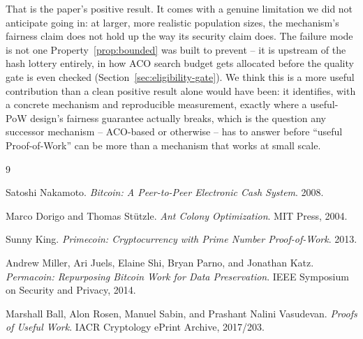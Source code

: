 \documentclass[journal]{IEEEtran}
\begin{document}
That is the paper's positive result. It comes with a genuine limitation we
did not anticipate going in: at larger, more realistic population sizes,
the mechanism's fairness claim does not hold up the way its security claim
does. The failure mode is not one Property~\ref{prop:bounded} was built to
prevent -- it is upstream of the hash lottery entirely, in how ACO search
budget gets allocated before the quality gate is even checked
(Section~\ref{sec:eligibility-gate}). We think this is a more useful
contribution than a clean positive result alone would have been: it
identifies, with a concrete mechanism and reproducible measurement, exactly
where a useful-PoW design's fairness guarantee actually breaks, which is
the question any successor mechanism -- ACO-based or otherwise -- has to
answer before ``useful Proof-of-Work'' can be more than a mechanism that
works at small scale.

\begin{thebibliography}{9}

Satoshi Nakamoto.
\textit{Bitcoin: A Peer-to-Peer Electronic Cash System}. 2008.

Marco Dorigo and Thomas St\"utzle.
\textit{Ant Colony Optimization}. MIT Press, 2004.

Sunny King.
\textit{Primecoin: Cryptocurrency with Prime Number Proof-of-Work}. 2013.

Andrew Miller, Ari Juels, Elaine Shi, Bryan Parno, and Jonathan Katz.
\textit{Permacoin: Repurposing Bitcoin Work for Data Preservation}.
IEEE Symposium on Security and Privacy, 2014.

Marshall Ball, Alon Rosen, Manuel Sabin, and Prashant Nalini Vasudevan.
\textit{Proofs of Useful Work}. IACR Cryptology ePrint Archive, 2017/203.

\end{thebibliography}
\end{document}
